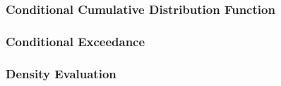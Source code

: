 \documentclass{beamer}
\begin{document}
\begin{frame}
  \frametitle{Conditional Cumulative Distribution Function}
\end{frame}

\begin{frame}
  \frametitle{Conditional Exceedance}
\end{frame}

\begin{frame}
  \frametitle{Density Evaluation}
\end{frame}
\end{document}
